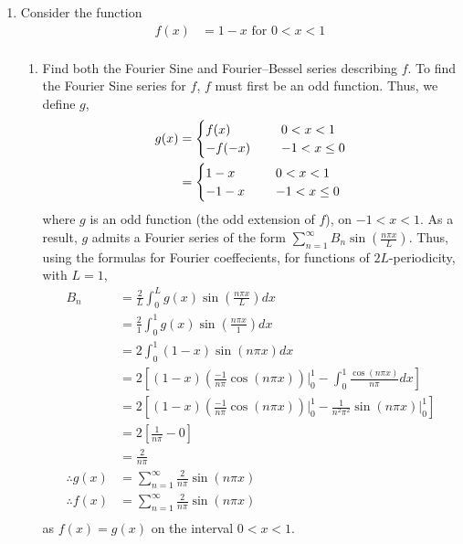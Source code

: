 \documentclass[a4paper]{article}
\newcommand{\ds}{\displaystyle}
\begin{document}
\begin{enumerate}
\begin{enumerate}
	\end{enumerate}

	\pagebreak
	\item Consider the function
	\begin{align*}
		f(x) & = 1-x \text{ for } 0<x<1\\
	\end{align*}
	\begin{enumerate}
		\item Find both the Fourier Sine and Fourier–Bessel series describing $\ds{f}$.
		\bigbreak
		To find the Fourier Sine series for $\ds{f}$, $\ds{f}$ must first be an odd function. Thus, we define $\ds{g}$,
		\begin{align*}
			g(x) & = 
			\begin{cases}
				f(x) \hspace{5mm} & 0<x<1\\
				-f(-x) \hspace{5mm} & -1<x\leq 0\\
			\end{cases}\\
			& = 
			\begin{cases}
				1-x \hspace{5mm} & 0<x<1\\
				-1-x \hspace{5mm} & -1<x\leq 0\\
			\end{cases}\\
		\end{align*}
		where $\ds{g}$ is an odd function (the odd extension of $\ds{f}$), on $\ds{-1<x<1}$. As a result, $\ds{g}$ admits a Fourier series of the form $\ds{\sum^{\infty}_{n=1}B_n\sin\left(\frac{n\pi x}{L}\right)}$. Thus, using the formulas for Fourier coeffecients, for functions of $\ds{2L}$-periodicity, with $\ds{L=1}$,
		\begin{align*}
			B_n & = \frac{2}{L}\int^{L}_{0}g(x)\sin\left(\frac{n\pi x}{L}\right)dx\\
			& = \frac{2}{1}\int^{1}_{0}g(x)\sin\left(\frac{n\pi x}{1}\right)dx\\
			& = 2\int^{1}_{0}(1-x)\sin\left(n\pi x\right)dx\\
			& = 2\left[(1-x)\left(\frac{-1}{n\pi}\cos(n\pi x) \right)\bigg|^1_0 - \int^{1}_{0}\frac{\cos\left(n\pi x\right)}{n\pi}dx\right]\\
			& = 2\left[(1-x)\left(\frac{-1}{n\pi}\cos(n\pi x) \right)\bigg|^1_0 - \frac{1}{n^2\pi^2}\sin\left(n\pi x\right)\bigg|^1_0\right]\\
			& = 2\left[\frac{1}{n\pi} - 0\right]\\
			& = \frac{2}{n\pi}\\
			\therefore g(x) & = \sum^{\infty}_{n=1}\frac{2}{n\pi}\sin\left(n\pi x\right)\\
			\therefore f(x) & = \sum^{\infty}_{n=1}\frac{2}{n\pi}\sin\left(n\pi x\right)\\
		\end{align*}
		as $\ds{f(x) = g(x)}$ on the interval $\ds{0<x<1}$.


\end{enumerate}
\end{enumerate}
\end{document}
